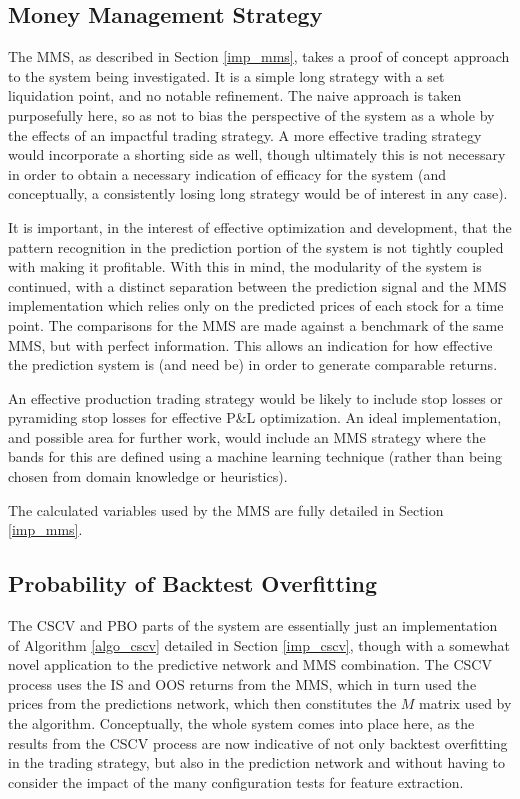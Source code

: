 \documentclass[a4paper,11pt,oneside]{article}
\theoremstyle{plain}
\theoremstyle{definition}
\begin{document}
	\subsection{Money Management Strategy}\label{proc_mms}
	
	The MMS, as described in Section \ref{imp_mms}, takes a proof of concept approach to the system being investigated. It is a simple long strategy with a set liquidation point, and no notable refinement. The naive approach is taken purposefully here, so as not to bias the perspective of the system as a whole by the effects of an impactful trading strategy. A more effective trading strategy would incorporate a shorting side as well, though ultimately this is not necessary in order to obtain a necessary indication of efficacy for the system (and conceptually, a consistently losing long strategy would be of interest in any case).  \newline
	
	It is important, in the interest of effective optimization and development, that the pattern recognition in the prediction portion of the system is not tightly coupled with making it profitable. With this in mind, the modularity of the system is continued, with a distinct separation between the prediction signal and the MMS implementation which relies only on the predicted prices of each stock for a time point. The comparisons for the MMS are made against a benchmark of the same MMS, but with perfect information. This allows an indication for how effective the prediction system is (and need be) in order to generate comparable returns. \newline
	
	An effective production trading strategy would be likely to include stop losses or pyramiding stop losses for effective P\&L optimization. An ideal implementation, and possible area for further work, would include an MMS strategy where the bands for this are defined using a machine learning technique (rather than being chosen from domain knowledge or heuristics).\newline
	
	The calculated variables used by the MMS are fully detailed in Section \ref{imp_mms}.
	
	\subsection{Probability of Backtest Overfitting}\label{proc_cscv}
	
	The CSCV and PBO parts of the system are essentially just an implementation of Algorithm \ref{algo_cscv} detailed in Section \ref{imp_cscv}, though with a somewhat novel application to the predictive network and MMS combination. The CSCV process uses the IS and OOS returns from the MMS, which in turn used the prices from the predictions network, which then constitutes the $M$ matrix used by the algorithm. Conceptually, the whole system comes into place here, as the results from the CSCV process are now indicative of not only backtest overfitting in the trading strategy, but also in the prediction network and without having to consider the impact of the many configuration tests for feature extraction.
	
\end{document}
